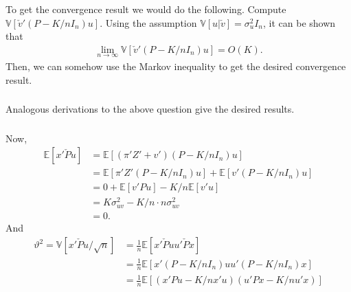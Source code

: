 \documentclass[12pt]{article}
\newcommand{\E}{\mathbb{E}}
\newcommand{\V}{\mathbb{V}}
\newcommand{\mtx}[1]{\ensuremath{\bm{\mathit{#1}}}}
\begin{document}
To get the convergence result we would do the following. Compute $\V[\check{\mtx{v}}'(\mtx{P} -K/n\mtx{I}_n) \mtx{u}]$. Using the assumption $\V[\mtx{u}|\check{\mtx{v}}] = \sigma^2_u\mtx{I}_n$, it can be shown that
\begin{align*}
\lim_{n\to \infty} \V[\check{\mtx{v}}'(\mtx{P} -K/n\mtx{I}_n) \mtx{u}] = O(K).
\end{align*}
Then, we can somehow use the Markov inequality to get the desired convergence result.

\iffalse
Now, to show the convergence result note that
\begin{align*}
 \check{\mtx{v}}'(\mtx{P} -K/n\mtx{I}_n) \mtx{u} &= {\mtx{v}}'\mtx{P}\mtx{u} -  \frac{\sigma^2_{uv}}{\sigma^2_u}\mtx{u}'\mtx{P}\mtx{u} - \frac{K}{n}\mtx{v}'\mtx{u} + \frac{K}{n}\frac{\sigma^2_{uv}}{\sigma^2_u}\mtx{u}'\mtx{u}
\end{align*}
Thus
\begin{align*}
\frac{1}{\sqrt{K}} \check{\mtx{v}}'(\mtx{P} -K/n\mtx{I}_n) \mtx{u} =  {\mtx{v}}'\mtx{P}\mtx{u} -  \frac{\sigma^2_{uv}}{\sigma^2_u}\mtx{u}'\mtx{P}\mtx{u} - \frac{K}{n}\mtx{v}'\mtx{u} + \frac{K}{n}\frac{\sigma^2_{uv}}{\sigma^2_u}\mtx{u}'\mtx{u}
\end{align*}
\fi

\subsubsection{}
Analogous derivations to the above question give the desired results.

\subsubsection{}
Now,
\begin{align*}
\E[\mtx{x}'\check{\mtx{P}}\mtx{u}] &= \E[(\mtx{\pi}'\mtx{Z}'+\mtx{v}')(\mtx{P} -K/n\mtx{I}_n)\mtx{u}]\\
&= \E[\mtx{\pi}'\mtx{Z}'(\mtx{P} -K/n\mtx{I}_n)\mtx{u}] + \E[\mtx{v}'(\mtx{P} -K/n\mtx{I}_n)\mtx{u}]\\
&=0 + \E[\mtx{v}'\mtx{P}\mtx{u}] - K/n\E[\mtx{v}'\mtx{u}]\\
&= K \sigma^2_{uv} - K/n \cdot n \sigma^2_{uv}\\
&=0.
\end{align*}
And
\begin{align*}
\vartheta^2 = \V[\mtx{x}'\check{\mtx{P}}\mtx{u}/\sqrt{n}] &= \frac{1}{n}\E[\mtx{x}'\check{\mtx{P}}\mtx{u}\mtx{u}'\check{\mtx{P}}\mtx{x}]\\
&=\frac{1}{n}\E[\mtx{x}'(\mtx{P} -K/n\mtx{I}_n)\mtx{u}\mtx{u}'(\mtx{P} -K/n\mtx{I}_n)\mtx{x}]\\
&=\frac{1}{n}\E[(\mtx{x}'\mtx{P}\mtx{u} - K/n\mtx{x}'\mtx{u})(\mtx{u}'\mtx{P}\mtx{x}-K/n\mtx{u}'\mtx{x})]
\end{align*}
\end{document}
